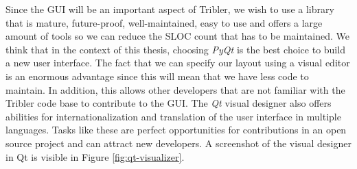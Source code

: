 Since the GUI will be an important aspect of Tribler, we wish to use a library that is mature, future-proof, well-maintained, easy to use and offers a large amount of tools so we can reduce the SLOC count that has to be maintained. We think that in the context of this thesis, choosing \emph{PyQt} is the best choice to build a new user interface. The fact that we can specify our layout using a visual editor is an enormous advantage since this will mean that we have less code to maintain. In addition, this allows other developers that are not familiar with the Tribler code base to contribute to the GUI. The \emph{Qt} visual designer also offers abilities for internationalization and translation of the user interface in multiple languages. Tasks like these are perfect opportunities for contributions in an open source project and can attract new developers. A screenshot of the visual designer in Qt is visible in Figure \ref{fig:qt-visualizer}.

